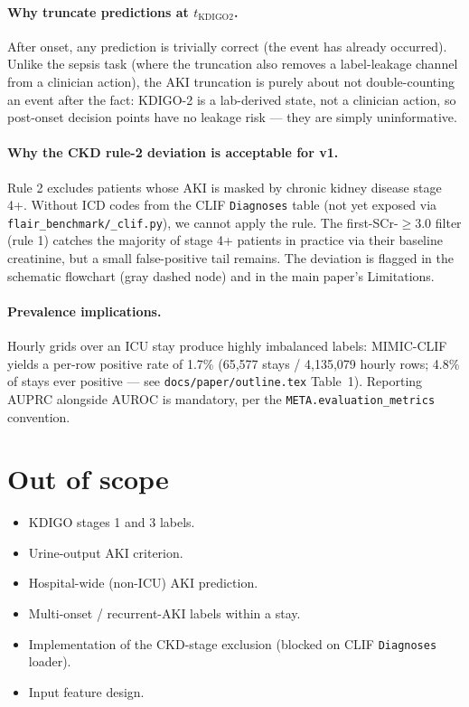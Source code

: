 \documentclass[11pt]{article}
\newcommand{\tkdtwo}{t_{\text{KDIGO2}}}
\begin{document}
\paragraph{Why truncate predictions at $\tkdtwo$.}
After onset, any prediction is trivially correct (the event has
already occurred). Unlike the sepsis task (where the truncation also
removes a label-leakage channel from a clinician action), the AKI
truncation is purely about not double-counting an event after the
fact: KDIGO-2 is a lab-derived state, not a clinician action, so
post-onset decision points have no leakage risk --- they are simply
uninformative.

\paragraph{Why the CKD rule-2 deviation is acceptable for v1.}
Rule 2 excludes patients whose AKI is masked by chronic kidney disease
stage 4+. Without ICD codes from the CLIF \texttt{Diagnoses} table
(not yet exposed via \texttt{flair\_benchmark/\_clif.py}), we cannot
apply the rule. The first-SCr-$\geq 3.0$ filter (rule 1) catches the
majority of stage 4+ patients in practice via their baseline
creatinine, but a small false-positive tail remains. The deviation is
flagged in the schematic flowchart (gray dashed node) and in the main
paper's Limitations.

\paragraph{Prevalence implications.}
Hourly grids over an ICU stay produce highly imbalanced labels:
MIMIC-CLIF yields a per-row positive rate of 1.7\% (65{,}577 stays /
4{,}135{,}079 hourly rows; 4.8\% of stays ever positive --- see
\texttt{docs/paper/outline.tex} Table~1). Reporting AUPRC alongside
AUROC is mandatory, per the \texttt{META.evaluation\_metrics}
convention.

\section{Out of scope}

\begin{itemize}[leftmargin=2em]
  \item KDIGO stages 1 and 3 labels.
  \item Urine-output AKI criterion.
  \item Hospital-wide (non-ICU) AKI prediction.
  \item Multi-onset / recurrent-AKI labels within a stay.
  \item Implementation of the CKD-stage exclusion (blocked on CLIF
        \texttt{Diagnoses} loader).
  \item Input feature design.
\end{itemize}



\end{document}
